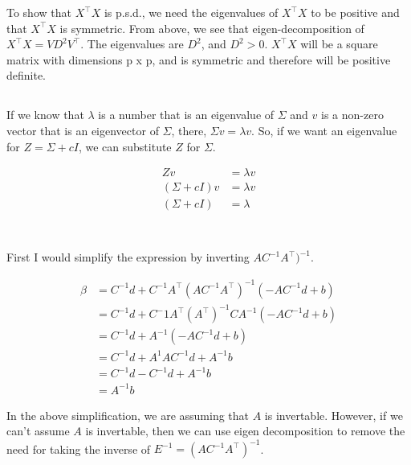 \documentclass{article}\usepackage[]{graphicx}\usepackage[]{color}
\begin{document}
To show that $X^\top X$ is p.s.d., we need  the eigenvalues of $X^\top X$ to be positive and that $X^\top X$ is symmetric. From above, we see that eigen-decomposition of  $X^\top X = V D^2 V^\top$. The eigenvalues are $D^2$, and $D^2>0$. $X^\top X$ will be a square matrix with dimensions p x p, and is symmetric and therefore will be positive definite.


\subsection{}
If we know that $\lambda$ is a number that is an eigenvalue of $\Sigma$ and $v$ is a non-zero vector that is an eigenvector of $\Sigma$, there, $\Sigma v = \lambda v$. So, if we want an eigenvalue for $Z = \Sigma + c I$, we can substitute $Z$ for $\Sigma$.

$$\begin{aligned}
Z v &= \lambda v \\
(\Sigma + c I) v &= \lambda v \\
(\Sigma + c I) &= \lambda \\
\end{aligned}$$

\section{}



\subsection{}

First I would simplify the expression by inverting $AC^{-1}A^\top)^{-1}$.

$$\begin{aligned}
\beta &= C^{-1} d +C^{-1}A^\top (AC^{-1}A^\top)^{-1} (-AC^{-1}d + b) \\
&= C^{-1} d + C^-1 A^\top (A^\top)^{-1}C A^{-1} (-AC^{-1}d + b) \\
&= C^{-1} d + A^{-1}  (-AC^{-1}d + b) \\
&= C^{-1} d + A^{1} A C^{-1}d + A^{-1} b \\
&= C^{-1} d - C^{-1} d + A^{-1}b \\
&=  A^{-1}b
\end{aligned}$$

In the above simplification, we are assuming that $A$ is invertable. However, if we can't assume $A$ is invertable, then we can use eigen decomposition to remove the need for taking the inverse of $E^{-1} =(AC^{-1}A^\top)^{-1}$.
\end{document}
